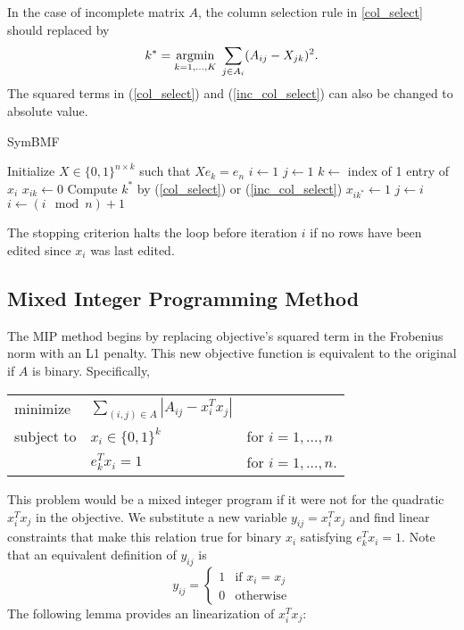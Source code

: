 In the case of incomplete matrix $A$, the column selection rule in
\ref{col_select} should replaced by
\begin{equation} \label{inc_col_select}
k^* = \underset{k = 1,...,K}{\mathrm{arg min}}\; \sum_{j \in A_i} (A_{ij} - X_{jk})^2.
\end{equation}
The squared terms in (\ref{col_select}) and (\ref{inc_col_select}) can
also be changed to absolute value.

\begin{algorithm}
\caption{SymBMF}
\begin{algorithmic}[1]
\State Initialize $X \in \{0, 1\}^{n \times k}$ such that $X e_k = e_n$
\State $i \gets 1$
\State $j \gets 1$
\Repeat
  \State $k \gets$ index of 1 entry of $x_i$
  \State $x_{ik} \gets 0$
  \State Compute $k^*$ by (\ref{col_select}) or (\ref{inc_col_select})
  \State $x_{ik^*} \gets 1$
   
    \State $j \gets i$
  \EndIf
  \State $i \gets (i \mod n) + 1$
\end{algorithmic}
\end{algorithm}

The stopping criterion halts the loop before iteration $i$ if no rows
have been edited since $x_i$ was last edited.


\subsection{Mixed Integer Programming Method}

The MIP method begins by replacing objective's squared term in the
Frobenius norm with an L1 penalty. This new objective function is
equivalent to the original if $A$ is binary. Specifically,
\begin{center}
\begin{tabular}{l l l}
minimize   & $\sum_{(i,j) \in A} |A_{ij} - x_i^T x_j|$ \\
subject to & $x_i \in \{0, 1\}^k$ & for $i = 1, ..., n$ \\
           & $e_k^T x_i = 1$ & for $i = 1, ..., n$.
\end{tabular}
\end{center}
This problem would be a mixed integer program if it were not for the
quadratic $x_i^T x_j$ in the objective. We substitute a new variable
$y_{ij} = x_i^T x_j$ and find linear constraints that make this
relation true for binary $x_i$ satisfying $e_k^T x_i = 1$.
Note that an equivalent definition of
$y_{ij}$ is
\[ y_{ij} = \begin{cases}
  1 & \text{if } x_i = x_j \\
  0 & \text{otherwise}
\end{cases}\]
The following lemma provides an linearization of $x_i^T x_j$:

